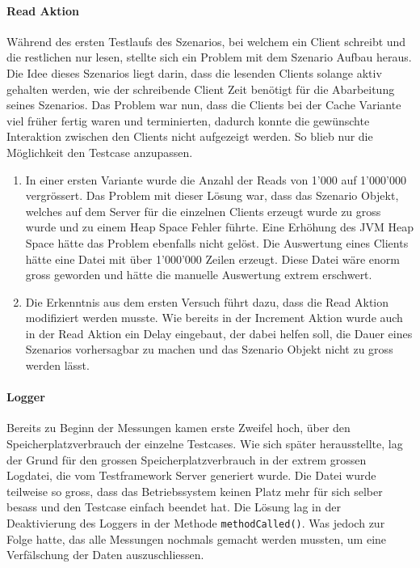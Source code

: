 \paragraph{Read Aktion}
Während des ersten Testlaufs des Szenarios, bei welchem ein Client schreibt und die restlichen nur lesen, stellte sich ein Problem mit dem Szenario Aufbau heraus. Die Idee dieses Szenarios liegt darin, dass die lesenden Clients solange aktiv gehalten werden, wie der schreibende Client Zeit benötigt für die Abarbeitung seines Szenarios. Das Problem war nun, dass die Clients bei der Cache Variante viel früher fertig waren und terminierten, dadurch konnte die gewünschte Interaktion zwischen den Clients nicht aufgezeigt werden. So blieb nur die Möglichkeit den Testcase anzupassen.
\begin{enumerate}
\item In einer ersten Variante wurde die Anzahl der Reads von 1'000 auf 1'000'000 vergrössert. Das Problem mit dieser Lösung war, dass das Szenario Objekt, welches auf dem Server für die einzelnen Clients erzeugt wurde zu gross wurde und zu einem Heap Space Fehler führte. Eine Erhöhung des JVM Heap Space hätte das Problem ebenfalls nicht gelöst. Die Auswertung eines Clients hätte eine Datei mit über 1'000'000 Zeilen erzeugt. Diese Datei wäre enorm gross geworden und hätte die manuelle Auswertung extrem erschwert.   
\item Die Erkenntnis aus dem ersten Versuch führt dazu, dass die Read Aktion modifiziert werden musste. Wie bereits in der Increment Aktion wurde auch in der Read Aktion ein Delay eingebaut, der dabei helfen soll, die Dauer eines Szenarios vorhersagbar zu machen und das Szenario Objekt nicht zu gross werden lässt.
\end{enumerate}

\paragraph{Logger}
Bereits zu Beginn der Messungen kamen erste Zweifel hoch, über den Speicherplatzverbrauch der einzelne Testcases. Wie sich später herausstellte, lag der Grund für den grossen Speicherplatzverbrauch in der extrem grossen Logdatei, die vom Testframework Server generiert wurde. Die Datei wurde teilweise so gross, dass das Betriebssystem keinen Platz mehr für sich selber besass und den Testcase einfach beendet hat. Die Lösung lag in der Deaktivierung des Loggers in der Methode \verb+methodCalled()+. Was jedoch zur Folge hatte, das alle Messungen nochmals gemacht werden mussten, um eine Verfälschung der Daten auszuschliessen.

